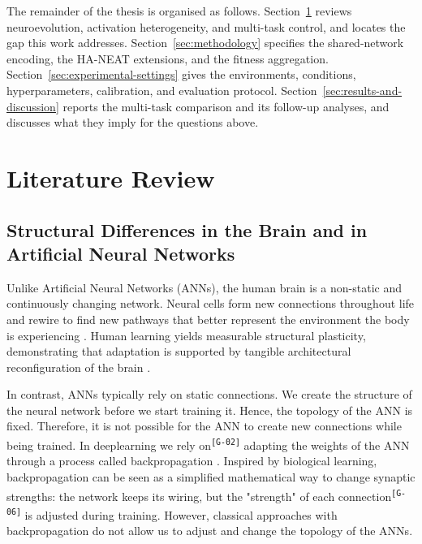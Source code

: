 \documentclass[12pt]{article}
\newcommand{\revID}[1]{\textsuperscript{\scriptsize\texttt{[#1]}}}
\newcommand{\revGram}[2]{\textcolor{lrRed}{#2}\revID{#1}}       %
\begin{document}
The remainder of the thesis is organised as follows.
Section~\ref{sec:literature-review} reviews neuroevolution, activation heterogeneity, and multi-task control, and locates the gap this work addresses.
Section~\ref{sec:methodology} specifies the shared-network encoding, the HA-NEAT extensions, and the fitness aggregation.
Section~\ref{sec:experimental-settings} gives the environments, conditions, hyperparameters, calibration, and evaluation protocol.
Section~\ref{sec:results-and-discussion} reports the multi-task comparison and its follow-up analyses, and discusses what they imply for the questions above.

\newpage
\section{Literature Review}
\label{sec:literature-review}


\subsection{Structural Differences in the Brain and in Artificial Neural Networks}
\label{subsec:structural-differences-in-the-brain-and}


Unlike Artificial Neural Networks (ANNs), the human brain is a non-static and continuously changing network.
Neural cells form new connections throughout life and rewire to find new pathways that better represent the environment the body is experiencing \parencite{pascual-leone_plastic_2005,holtmaat_experience-dependent_2009}.
Human learning yields measurable structural plasticity, demonstrating that adaptation is supported by tangible architectural reconfiguration of the brain \parencite{draganski_changes_2004}.

In contrast, ANNs typically rely on static connections.
We create the structure of the neural network before we start training it.
Hence, the topology of the ANN is fixed.
Therefore, it is not possible for the ANN to create new connections while being trained.
\revGram{G-02}{In deeplearning we rely on} adapting the weights of the ANN through a process called backpropagation \parencite{rumelhart_learning_1986}.
Inspired by biological learning, backpropagation can be seen as a simplified mathematical way to change synaptic strengths: the network keeps its wiring, but \revGram{G-06}{the "strength" of each connection} is adjusted during training.
However, classical approaches with backpropagation do not allow us to adjust and change the topology of the ANNs.
\end{document}
